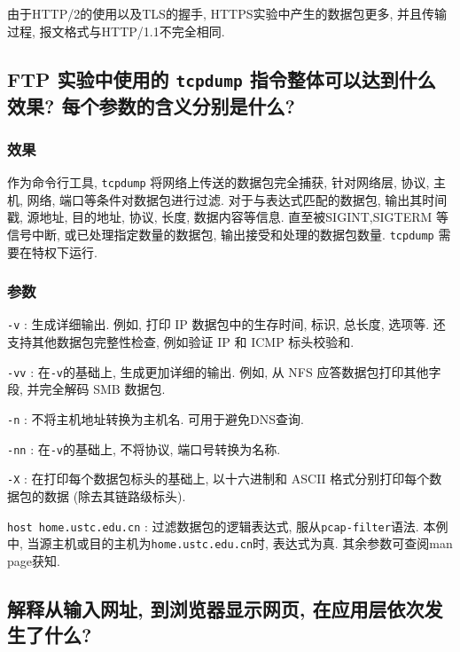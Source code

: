 \documentclass{ned-article}
\begin{document}
由于HTTP/2的使用以及TLS的握手, HTTPS实验中产生的数据包更多, 并且传输过程, 报文格式与HTTP/1.1不完全相同.

\subsection[第3题]{FTP 实验中使用的 \texttt{tcpdump} 指令整体可以达到什么效果? 每个参数的含义分别是什么?}

\subsubsection*{效果}
作为命令行工具, \texttt{tcpdump} 将网络上传送的数据包完全捕获, 针对网络层, 协议, 主机, 网络, 端口等条件对数据包进行过滤. 对于与表达式匹配的数据包, 输出其时间戳, 源地址, 目的地址, 协议, 长度, 数据内容等信息. 直至被SIGINT,SIGTERM 等信号中断, 或已处理指定数量的数据包, 输出接受和处理的数据包数量. \texttt{tcpdump} 需要在特权下运行.

\subsubsection*{参数}

\texttt{-v} : 生成详细输出. 例如, 打印 IP 数据包中的生存时间, 标识, 总长度, 选项等. 还支持其他数据包完整性检查, 例如验证 IP 和 ICMP 标头校验和.

\texttt{-vv} : 在\texttt{-v}的基础上, 生成更加详细的输出. 例如, 从 NFS 应答数据包打印其他字段, 并完全解码 SMB 数据包.

\texttt{-n} : 
不将主机地址转换为主机名. 可用于避免DNS查询.

\texttt{-nn} : 
在\texttt{-v}的基础上, 不将协议, 端口号转换为名称. 

\texttt{-X} : 在打印每个数据包标头的基础上, 以十六进制和 ASCII 格式分别打印每个数据包的数据 (除去其链路级标头).

\texttt{host home.ustc.edu.cn} : 过滤数据包的逻辑表达式, 服从\texttt{pcap-filter}语法. 本例中, 当源主机或目的主机为\texttt{home.ustc.edu.cn}时, 表达式为真. 其余参数可查阅man page获知.

\subsection[第4题]{解释从输入网址, 到浏览器显示网页, 在应用层依次发生了什么?}
\end{document}

